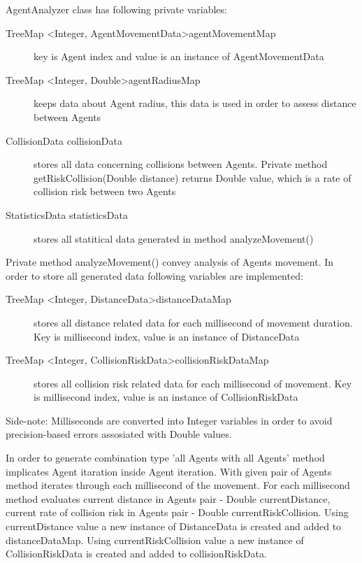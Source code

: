 \documentclass[thesis=B,english]{FITthesis}[2019/12/23]
\begin{document}
AgentAnalyzer class has following private variables:
\begin{description}
\item[TreeMap \textless Integer,  AgentMovementData\textgreater agentMovementMap] key is Agent index and value is an instance of AgentMovementData
\item[TreeMap \textless Integer, Double\textgreater agentRadiusMap] keeps data about Agent radius, this data is used in order to assess distance between Agents
\item[CollisionData collisionData] stores all data concerning collisions between Agents. Private method getRiskCollision(Double distance) returns Double value, which is a rate of collision risk between two Agents
\item[StatisticsData statisticsData] stores all statitical data generated in method analyzeMovement()
\end{description}

Private method analyzeMovement() convey analysis of Agents movement. In order to store all generated data following variables are implemented:
\begin{description}
\item[TreeMap \textless Integer, DistanceData\textgreater distanceDataMap] stores all distance related data for each millisecond of movement duration. Key is millisecond index, value is an instance of DistanceData  
\item[TreeMap \textless Integer, CollisionRiskData\textgreater collisionRiskDataMap] stores all collision risk related data for each millisecond of movement. Key is millisecond index, value is an instance of CollisionRiskData
\end{description}	

Side-note: Milliseconds are converted into Integer variables in order to avoid precision-based errors assosiated with Double values.

In order to generate combination type 'all Agents with all Agents' method implicates Agent itaration inside Agent iteration. With given pair of Agents method iterates through each millisecond of the movement. For each millisecond method evaluates current distance in Agents pair - Double currentDistance, current rate of collision risk in Agents pair - Double currentRiskCollision. Using currentDistance value a new instance of DistanceData is created and added to distanceDataMap. Using currentRiskCollision value a new instance of CollisionRiskData is created and added to collisionRiskData. 
\end{document}

